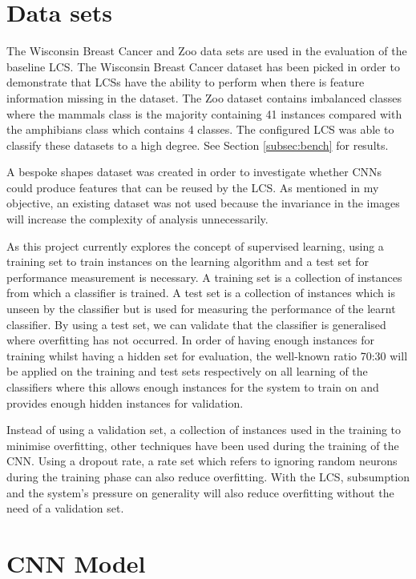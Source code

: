 \section{Data sets} \label{subsec:datasets}
The Wisconsin Breast Cancer \cite{wisconsinbreast} and Zoo \cite{zoodata} data sets are used in the evaluation of the baseline LCS. The Wisconsin Breast Cancer dataset has been picked in order to demonstrate that LCSs have the ability to perform when there is feature information missing in the dataset. The Zoo dataset contains imbalanced classes where the mammals class is the majority containing 41 instances compared with the amphibians class which contains 4 classes. The configured LCS was able to classify these datasets to a high degree. See Section \ref{subsec:bench} for results. 

A bespoke shapes dataset was created in order to investigate whether CNNs could produce features that can be reused by the LCS. As mentioned in my objective, an existing dataset was not used because the invariance in the images will increase the complexity of analysis unnecessarily. 

As this project currently explores the concept of supervised learning, using a training set to train instances on the learning algorithm and a test set for performance measurement is necessary. A training set is a collection of instances from which a classifier is trained. A test set is a collection of instances which is unseen by the classifier but is used for measuring the performance of the learnt classifier. By using a test set, we can validate that the classifier is generalised where overfitting has not occurred. In order of having enough instances for training whilst having a hidden set for evaluation, the well-known ratio 70:30 will be applied on the training and test sets respectively on all learning of the classifiers where this allows enough instances for the system to train on and provides enough hidden instances for validation.

Instead of using a validation set, a collection of instances used in the training to minimise overfitting, other techniques have been used during the training of the CNN. Using a dropout rate, a rate set which refers to ignoring random neurons during the training phase can also reduce overfitting. With the LCS, subsumption and the system’s pressure on generality will also reduce overfitting without the need of a validation set.

\section{CNN Model}

